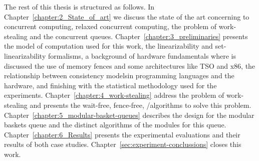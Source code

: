The rest of this thesis is structured as follows. In Chapter~\ref{chapter:2_State_of_art} we discuss the state of the art concerning to concurrent computing, relaxed concurrent computing, the problem of work-stealing and the concurrent queues. Chapter~\ref{chapter:3_preliminaries} presents the model of computation used for this work, the linearizability and set-linearizability formalisms, a background of hardware fundamentals where is discussed the use of memory fences and some architectures like TSO and x86, the relationship between consistency modelsin programming languages and the hardware, and finishing with the statistical methodology used for the experiments. Chapter~\ref{chapter:4_work-stealing} address the problem of work-stealing and presents the wait-free, fence-free, \R/\W algorithms to solve this problem. Chapter~\ref{chapter:5_modular-basket-queues} describes the design for the modular baskets queue and the distinct algorithms of the modules for this queue. Chapter~\ref{chapter:6_Results} presents the experimental evaluations and their results of both case studies. Chapter~\ref{sec:experiment-conclussions} closes this work.
